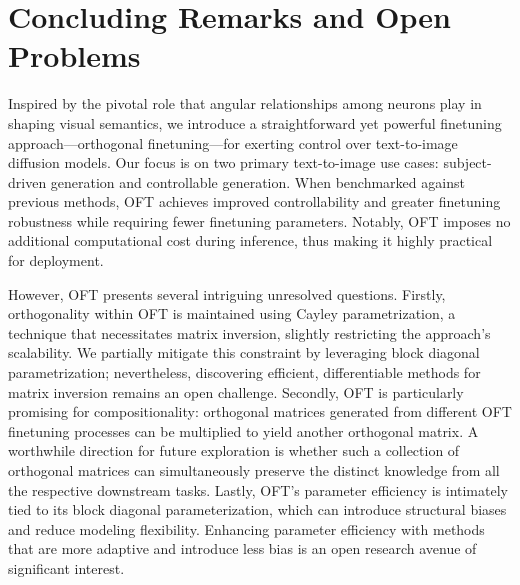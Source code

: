 \section{Concluding Remarks and Open Problems}

Inspired by the pivotal role that angular relationships among neurons play in shaping visual semantics, we introduce a straightforward yet powerful finetuning approach—orthogonal finetuning—for exerting control over text-to-image diffusion models. Our focus is on two primary text-to-image use cases: subject-driven generation and controllable generation. When benchmarked against previous methods, OFT achieves improved controllability and greater finetuning robustness while requiring fewer finetuning parameters. Notably, OFT imposes no additional computational cost during inference, thus making it highly practical for deployment.

However, OFT presents several intriguing unresolved questions. Firstly, orthogonality within OFT is maintained using Cayley parametrization, a technique that necessitates matrix inversion, slightly restricting the approach’s scalability. We partially mitigate this constraint by leveraging block diagonal parametrization; nevertheless, discovering efficient, differentiable methods for matrix inversion remains an open challenge. Secondly, OFT is particularly promising for compositionality: orthogonal matrices generated from different OFT finetuning processes can be multiplied to yield another orthogonal matrix. A worthwhile direction for future exploration is whether such a collection of orthogonal matrices can simultaneously preserve the distinct knowledge from all the respective downstream tasks. Lastly, OFT's parameter efficiency is intimately tied to its block diagonal parameterization, which can introduce structural biases and reduce modeling flexibility. Enhancing parameter efficiency with methods that are more adaptive and introduce less bias is an open research avenue of significant interest.

